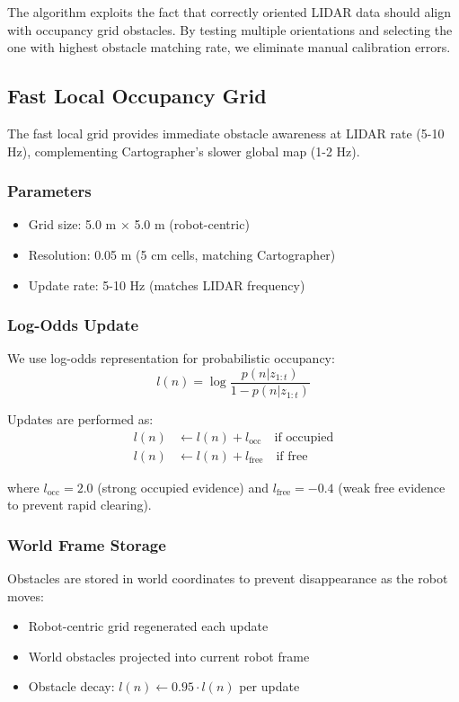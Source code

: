 \documentclass[11pt,a4paper]{article}
\begin{document}
The algorithm exploits the fact that correctly oriented LIDAR data should align with occupancy grid obstacles. By testing multiple orientations and selecting the one with highest obstacle matching rate, we eliminate manual calibration errors.

\subsection{Fast Local Occupancy Grid}

The fast local grid provides immediate obstacle awareness at LIDAR rate (5-10 Hz), complementing Cartographer's slower global map (1-2 Hz).

\subsubsection{Parameters}
\begin{itemize}
    \item Grid size: 5.0 m × 5.0 m (robot-centric)
    \item Resolution: 0.05 m (5 cm cells, matching Cartographer)
    \item Update rate: 5-10 Hz (matches LIDAR frequency)
\end{itemize}

\subsubsection{Log-Odds Update}

We use log-odds representation for probabilistic occupancy:
\begin{equation}
l(n) = \log \frac{p(n|z_{1:t})}{1 - p(n|z_{1:t})}
\end{equation}

Updates are performed as:
\begin{align}
l(n) &\leftarrow l(n) + l_{\text{occ}} \quad \text{if occupied} \\
l(n) &\leftarrow l(n) + l_{\text{free}} \quad \text{if free}
\end{align}

where $l_{\text{occ}} = 2.0$ (strong occupied evidence) and $l_{\text{free}} = -0.4$ (weak free evidence to prevent rapid clearing).

\subsubsection{World Frame Storage}

Obstacles are stored in world coordinates to prevent disappearance as the robot moves:
\begin{itemize}
    \item Robot-centric grid regenerated each update
    \item World obstacles projected into current robot frame
    \item Obstacle decay: $l(n) \leftarrow 0.95 \cdot l(n)$ per update
\end{itemize}
\end{document}
